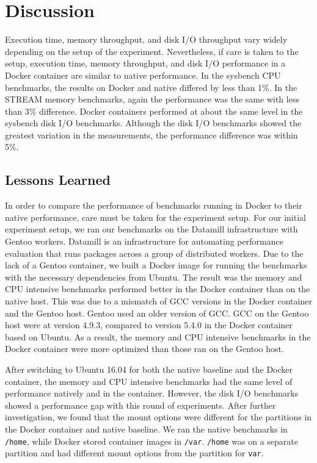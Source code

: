 \documentclass[11pt]{article}
\begin{document}
\section{Discussion}
Execution time, memory throughput, and disk I/O throughput vary widely depending on the setup of the experiment. Nevertheless, if care is taken to the setup, execution time, memory throughput, and disk I/O performance in a Docker container are similar to native performance. In the sysbench CPU benchmarks, the results on Docker and native differed by less than 1\%. In the STREAM memory benchmarks, again the performance was the same with less than 3\% difference. Docker containers performed at about the same level in the sysbench disk I/O benchmarks. Although the disk I/O benchmarks showed the greatest variation in the measurements, the performance difference was within 5\%. 


\subsection{Lessons Learned}
In order to compare the performance of benchmarks running in Docker to their native performance, care must be taken for the experiment setup. For our initial experiment setup, we ran our benchmarks on the Datamill infrastructure with Gentoo workers. Datamill is an infrastructure for automating performance evaluation that runs packages across a group of distributed workers. Due to the lack of a Gentoo container, we built a Docker image for running the benchmarks with the necessary dependencies from Ubuntu. The result was the memory and CPU intensive benchmarks performed better in the Docker container than on the native host. This was due to a mismatch of GCC versions in the Docker container and the Gentoo host. Gentoo used an older version of GCC. GCC on the Gentoo host were at version 4.9.3, compared to version 5.4.0 in the Docker container based on Ubuntu. As a result, the memory and CPU intensive benchmarks in the Docker container were more optimized than those ran on the Gentoo host. 

After switching to Ubuntu 16.04 for both the native baseline and the Docker container, the memory and  CPU intensive benchmarks had the same level of performance natively and in the container. However, the disk I/O benchmarks showed a performance gap with this round of experiments. After further investigation, we found that the mount options were different for the partitions in the Docker container and native baseline. We ran the native benchmarks in \texttt{/home}, while Docker stored container images in \texttt{/var}. \texttt{/home} was on a separate partition and had different mount options from the partition for \texttt{var}. 
\end{document}
